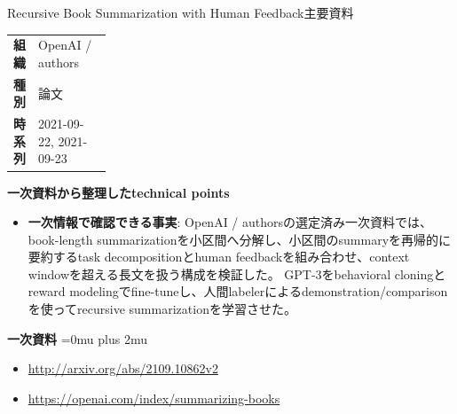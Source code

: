 \begin{technicalnote}{Recursive Book Summarization with Human Feedback}{主要資料}
\begingroup
\begin{tabularx}{\linewidth}{@{}>{\bfseries}p{0.22\linewidth}X@{}}
組織 & OpenAI / authors \\
種別 & 論文 \\
時系列 & 2021-09-22, 2021-09-23 \\
\end{tabularx}
\smallskip
{\bfseries 一次資料から整理したtechnical points}
\begin{itemize}[leftmargin=1.5em,itemsep=0.35em]
\item \textbf{一次情報で確認できる事実}: OpenAI / authorsの選定済み一次資料では、book-length summarizationを小区間へ分解し、小区間のsummaryを再帰的に要約するtask decompositionとhuman feedbackを組み合わせ、context windowを超える長文を扱う構成を検証した。 GPT-3をbehavioral cloningとreward modelingでfine-tuneし、人間labelerによるdemonstration/comparisonを使ってrecursive summarizationを学習させた。
\end{itemize}
\begin{minipage}{\linewidth}
\begin{samepage}
{\bfseries 一次資料}
\begingroup\sloppy
\Urlmuskip=0mu plus 2mu\relax
\begin{itemize}[leftmargin=1.5em,itemsep=0.25em]
\item {\scriptsize\url{http://arxiv.org/abs/2109.10862v2}}
\item {\scriptsize\url{https://openai.com/index/summarizing-books}}
\end{itemize}
\endgroup
\end{samepage}
\end{minipage}
\endgroup
\end{technicalnote}
\medskip

